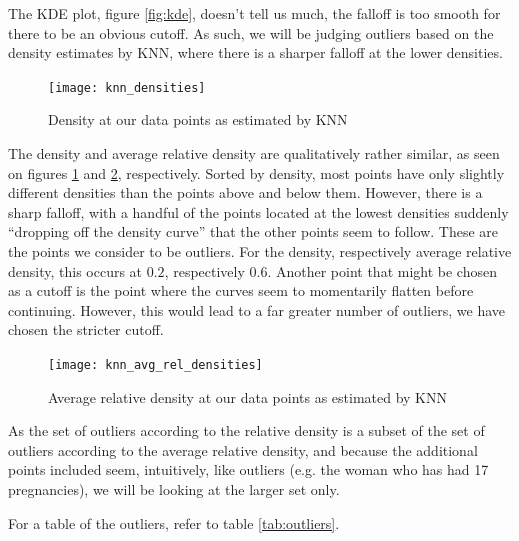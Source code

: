 The KDE plot, figure \ref{fig:kde},
doesn't tell us much,
the falloff is too smooth
for there to be an obvious cutoff.
As such,
we will be judging outliers based on the
density estimates by KNN,
where there is a sharper falloff at the lower densities.

\begin{figure}[htbp]
  \centering
  \texttt{[image: knn\_densities]}
  \caption{Density at our data points as estimated by KNN}
  \label{fig:knn}
\end{figure}

The density and average relative density are qualitatively rather similar,
as seen on figures \ref{fig:knn} and \ref{fig:knn-avg-rel}, respectively.
Sorted by density,
most points have only slightly different densities than the points
above and below them.
However, there is a sharp falloff,
with a handful of the points located at the lowest densities
suddenly ``dropping off the density curve''
that the other points seem to follow.
These are the points we consider to be outliers.
For the density, respectively average relative density,
this occurs at $0.2$, respectively $0.6$.
Another point that might be chosen as a cutoff is
the point where the curves seem to momentarily flatten before continuing.
However, this would lead to a far greater number of outliers,
we have chosen the stricter cutoff.

\begin{figure}[htbp]
  \centering
  \texttt{[image: knn\_avg\_rel\_densities]}
  \caption{Average relative density at our data points as estimated by KNN}
  \label{fig:knn-avg-rel}
\end{figure}

As the set of outliers according to the relative density
is a subset of
the set of outliers according to the average relative density,
and because the additional points included seem, intuitively, like outliers
(e.g. the woman who has had 17 pregnancies),
we will be looking at the larger set only.

For a table of the outliers, refer to table \ref{tab:outliers}.

